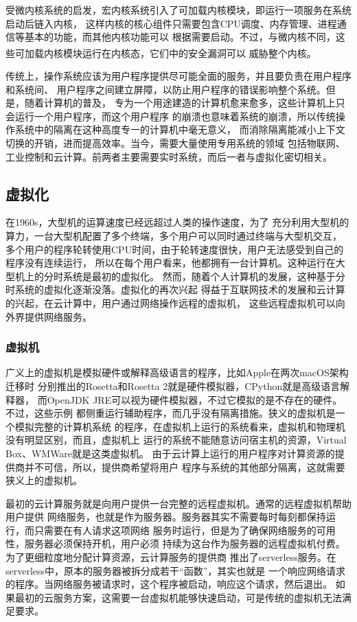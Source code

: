 \documentclass[UTF8,fontset=none,linespread=1.15]{ctexart}
\let\nosupcite\cite
\renewcommand*{\cite}[1]{\textsuperscript{\nosupcite{#1}}}
\begin{document}
受微内核系统的启发，宏内核系统引入了可加载内核模块，即运行一项服务在系统启动后链入内核，
这样内核的核心组件只需要包含CPU调度、内存管理、进程通信等基本的功能，而其他内核功能可以
根据需要启动。不过，与微内核不同，这些可加载内核模块运行在内核态，它们中的安全漏洞可以
威胁整个内核。\cite{bib:os-concept}

传统上，操作系统应该为用户程序提供尽可能全面的服务，并且要负责在用户程序和系统间、
用户程序之间建立屏障，以防止用户程序的错误影响整个系统。但是，随着计算机的普及，
专为一个用途建造的计算机愈来愈多，这些计算机上只会运行一个用户程序，而这个用户程序
的崩溃也意味着系统的崩溃，所以传统操作系统中的隔离在这种高度专一的计算机中毫无意义，
而消除隔离能减小上下文切换的开销，进而提高效率。当今，需要大量使用专用系统的领域
包括物联网、工业控制和云计算。前两者主要需要实时系统，而后一者与虚拟化密切相关。

\subsection{虚拟化}
在1960s，大型机的运算速度已经远超过人类的操作速度，为了
充分利用大型机的算力，一台大型机配置了多个终端，多个用户可以同时通过终端与大型机交互，
多个用户的程序轮转使用CPU时间，由于轮转速度很快，用户无法感受到自己的程序没有连续运行，
所以在每个用户看来，他都拥有一台计算机。这种运行在大型机上的分时系统是最初的虚拟化。
然而，随着个人计算机的发展，这种基于分时系统的虚拟化逐渐没落。虚拟化的再次兴起
得益于互联网技术的发展和云计算的兴起，在云计算中，用户通过网络操作远程的虚拟机，
这些远程虚拟机可以向外界提供网络服务。

\subsubsection{虚拟机}
广义上的虚拟机是模拟硬件或解释高级语言的程序，比如Apple在两次macOS架构迁移时
分别推出的Rosetta和Rosetta 2就是硬件模拟器，CPython就是高级语言解释器，
而OpenJDK JRE可以视为硬件模拟器，不过它模拟的是不存在的硬件。不过，这些示例
都侧重运行辅助程序，而几乎没有隔离措施。狭义的虚拟机是一个模拟完整的计算机系统
的程序，在虚拟机上运行的系统看来，虚拟机和物理机没有明显区别，而且，虚拟机上
运行的系统不能随意访问宿主机的资源，Virtual Box、WMWare就是这类虚拟机。
由于云计算上运行的用户程序对计算资源的提供商并不可信，所以，提供商希望将用户
程序与系统的其他部分隔离，这就需要狭义上的虚拟机。

最初的云计算服务就是向用户提供一台完整的远程虚拟机。通常的远程虚拟机帮助用户提供
网络服务，也就是作为服务器。服务器其实不需要每时每刻都保持运行，而只需要在有人请求这项网络
服务时运行，但是为了确保网络服务的可用性，服务器必须保持开机，用户必须
持续为这台作为服务器的远程虚拟机付费。为了更细粒度地分配计算资源，云计算服务的提供商
推出了serverless服务。在serverless中，原本的服务器被拆分成若干“函数”，其实也就是
一个响应网络请求的程序。当网络服务被请求时，这个程序被启动，响应这个请求，然后退出。
如果最初的云服务方案，这需要一台虚拟机能够快速启动，可是传统的虚拟机无法满足要求。
\end{document}
